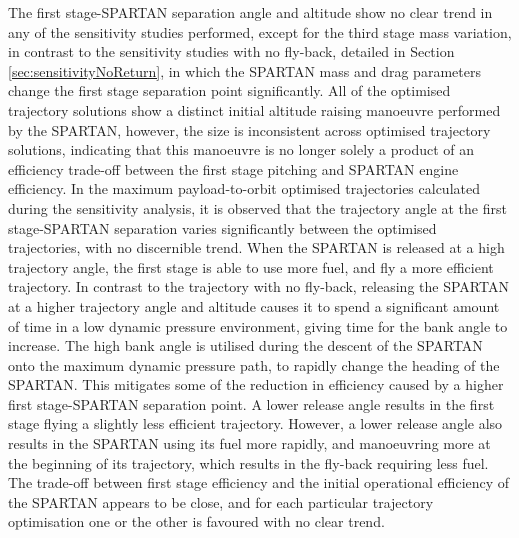 The first stage-SPARTAN separation angle and altitude show no clear trend in any of the sensitivity studies performed, except for the third stage mass variation, in contrast to the sensitivity studies with no fly-back, detailed in Section \ref{sec:sensitivityNoReturn}, in which the SPARTAN mass and drag parameters change the first stage separation point significantly. All of the optimised trajectory solutions show a distinct initial altitude raising manoeuvre performed by the SPARTAN, however, the size is inconsistent across optimised trajectory solutions, indicating that this manoeuvre is no longer solely a product of an efficiency trade-off between the first stage pitching and SPARTAN engine efficiency.
In the maximum payload-to-orbit optimised trajectories calculated during the sensitivity analysis, it is observed that the trajectory angle at the first stage-SPARTAN separation varies significantly between the optimised trajectories, with no discernible trend. When the SPARTAN is released at a high trajectory angle, the first stage is able to use more fuel, and fly a more efficient trajectory. In contrast to the trajectory with no fly-back,
releasing the SPARTAN at a higher trajectory angle and altitude causes it to spend a significant amount of time in a low dynamic pressure environment, giving time for the bank angle to increase. The high bank angle is utilised during the descent of the SPARTAN onto the maximum dynamic pressure path, to rapidly change the heading of the SPARTAN. This mitigates some of the reduction in efficiency caused by a higher first stage-SPARTAN separation point.
 A lower release angle results in the first stage flying a slightly less efficient trajectory. However, a lower release angle also results in the SPARTAN using its fuel more rapidly, and manoeuvring more at the beginning of its trajectory, which results in the fly-back requiring less fuel. 
The trade-off between first stage efficiency and the initial operational efficiency of the SPARTAN appears to be close, and 
for each particular trajectory optimisation one or the other is favoured with no clear trend. 


